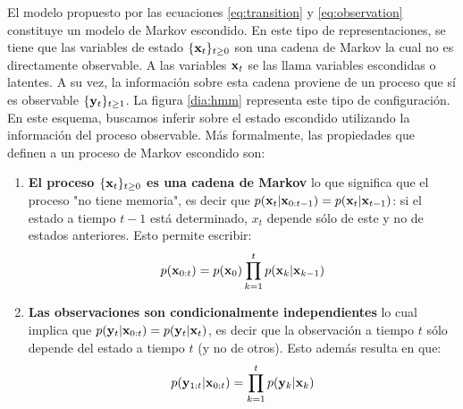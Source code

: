El modelo propuesto por las ecuaciones \ref{eq:transition} y \ref{eq:observation} constituye un modelo de Markov escondido. En este tipo de representaciones, se tiene que las variables de estado $\{\mathbf{x}_t\}_{t \ge 0}$ son una cadena de Markov la cual no es directamente observable. A las variables $\mathbf{x}_t$ se las llama variables escondidas o latentes. A su vez, la información sobre esta cadena proviene de un proceso que sí es observable $\{\mathbf{y}_t\}_{t \ge 1}$. La figura \ref{dia:hmm} representa este tipo de configuración. En este esquema, buscamos inferir sobre el estado escondido utilizando la información del proceso observable. Más formalmente, las propiedades que definen a un proceso de Markov escondido son: 
\begin{enumerate}
    \item \textbf{El proceso $\{\mathbf{x}_t\}_{t \ge 0}$ es una cadena de Markov} lo que significa que el proceso "no tiene memoria", es decir que $p(\mathbf{x}_t | \mathbf{x}_{0:t-1}) = p(\mathbf{x}_t | \mathbf{x}_{t-1})$: si el estado a tiempo $t-1$ está determinado, $x_t$ depende sólo de este y no de estados anteriores. Esto permite escribir:
    \begin{align*}
        p(\mathbf{x}_{0:t}) = p(\mathbf{x}_0) \prod_{k=1}^{t} p(\mathbf{x}_k | \mathbf{x}_{k-1})
    \end{align*}
    \item \textbf{Las observaciones son condicionalmente independientes}  lo cual implica que $p(\mathbf{y}_t | \mathbf{x}_{0:t}) = p(\mathbf{y}_t | \mathbf{x}_t)$, es decir que la observación a tiempo $t$ sólo depende del estado a tiempo $t$ (y no de otros). Esto además resulta en que:
    \begin{align*}
        p(\mathbf{y}_{1:t} | \mathbf{x}_{0:t}) = \prod_{k=1}^{t} p(\mathbf{y}_k | \mathbf{x}_k)
    \end{align*}
\end{enumerate}

